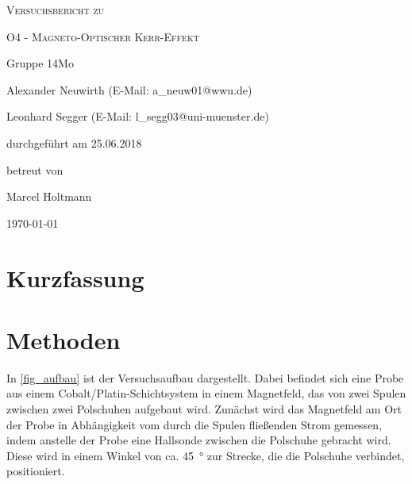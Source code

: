 \documentclass[
	a4paper,
	12pt,
	pagesize,
	ngerman
]{scrartcl}
\begin{document}
	
	\begin{titlepage}
		\centering
		{\scshape\LARGE Versuchsbericht zu \par}
		\vspace{1cm}
		{\scshape\huge O4 - Magneto-Optischer Kerr-Effekt \par}
		\vspace{2.5cm}
		{\LARGE Gruppe 14Mo \par}
		\vspace{0.5cm}
		
		{\large Alexander Neuwirth (E-Mail: a\_neuw01@wwu.de) \par}
		{\large Leonhard Segger (E-Mail: l\_segg03@uni-muenster.de) \par}
		\vfill
		
		durchgeführt am 25.06.2018\par
		betreut von\par
		{\large Marcel Holtmann} %
		
		\vfill
		
		{\large \today\par}
	\end{titlepage}
	\tableofcontents
	\newpage


	\section{Kurzfassung}
	
	\section{Methoden}
	In \cref{fig_aufbau} ist der Versuchsaufbau dargestellt.
	Dabei befindet sich eine Probe aus einem Cobalt/Platin-Schichtsystem in einem Magnetfeld, das von zwei Spulen zwischen zwei Polschuhen aufgebaut wird.
	Zunächst wird das Magnetfeld am Ort der Probe in Abhängigkeit vom durch die Spulen fließenden Strom gemessen, indem anstelle der Probe eine Hallsonde zwischen die Polschuhe gebracht wird.
	Diese wird in einem Winkel von ca. \SI{45}{\degree} zur Strecke, die die Polschuhe verbindet, positioniert. 	
\end{document}
